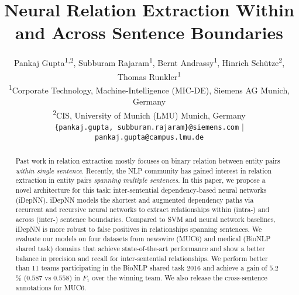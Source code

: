 \documentclass[letterpaper]{article} \usepackage{aaai19}  \usepackage{times}  \usepackage{helvet}  \usepackage{courier}  \usepackage{url}  \usepackage{graphicx}
\newcommand*{\affaddr}[1]{#1} \newcommand*{\affmark}[1][*]{\textsuperscript{#1}}
\newcommand*{\email}[1]{\texttt{#1}}
\begin{document}
\setcounter{secnumdepth}{0}  
\title{Neural Relation Extraction Within and Across Sentence Boundaries}

\author{Pankaj Gupta\affmark[1,2], Subburam Rajaram\affmark[1], Bernt Andrassy\affmark[1], Hinrich Sch\"{u}tze\affmark[2], Thomas Runkler\affmark[1]\\ 
 \affaddr{\affmark[1]Corporate Technology, Machine-Intelligence (MIC-DE), Siemens AG  Munich, Germany}\\
  \affaddr{\affmark[2]CIS, University of Munich (LMU) Munich, Germany} \\
  \email{\{pankaj.gupta, subburam.rajaram\}@siemens.com} $|$ 
  \email{ pankaj.gupta@campus.lmu.de}
}

\maketitle


\begin{abstract}

Past work in relation extraction mostly focuses on binary
relation between entity pairs \emph{within single sentence}.
Recently, the NLP community has gained interest in relation
extraction in entity pairs \emph{spanning multiple
  sentences}.  In this paper, we propose
a novel architecture for this task:
inter-sentential
dependency-based neural networks (iDepNN).
iDepNN models the
shortest and augmented dependency paths via recurrent and
recursive neural networks to extract relationships within
(intra-) and across (inter-) sentence boundaries.  Compared
to SVM and neural network baselines, iDepNN is more robust to false positives
in relationships spanning sentences.  We evaluate our models
on four datasets from newswire (MUC6) and medical (BioNLP
shared task) domains that achieve state-of-the-art
performance and show a better balance in precision and
recall for inter-sentential relationships. 
We perform better than 11 teams participating in 
the BioNLP shared task 2016 
and achieve a gain of $5.2$\% ($0.587$ vs $0.558$) in $F_1$ over the winning team. 
 We also release the
cross-sentence annotations for MUC6.
\end{abstract}
\end{document}
